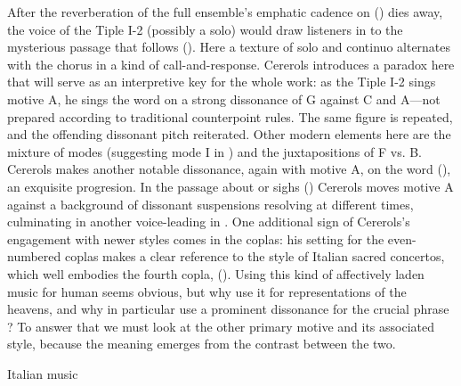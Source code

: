 After the reverberation of the full ensemble's emphatic cadence on
 () dies away, the voice of the Tiple I-2
(possibly a solo) would draw listeners in to the mysterious passage that
follows ().
Here a texture of solo and continuo alternates with the chorus in a kind of
call-and-response.
Cererols introduces a paradox here that will serve as an interpretive key for
the whole work: as the Tiple I-2 sings motive A, he sings the word
 on a strong dissonance of G against C\sh{} and A---not
prepared according to traditional counterpoint rules.
The same figure is repeated, and the offending dissonant pitch reiterated.
Other modern elements here are the mixture of modes (suggesting mode I in
) and the juxtapositions of F\sh{} vs. B\fl{}.
Cererols makes another notable dissonance, again with motive A, on the word
 (), an exquisite
 progresion.
In the passage about  or sighs () Cererols
moves motive A against a background of dissonant suspensions resolving at
different times, culminating in another voice-leading  in
.
One additional sign of Cererols's engagement with newer styles comes in the
coplas: his setting for the even-numbered coplas makes a clear reference to the
style of Italian sacred concertos, which well embodies the fourth copla,
 ().
Using this kind of affectively laden music for human  seems
obvious, but why use it for representations of the heavens, and why in
particular use a prominent dissonance for the crucial phrase ?
To answer that we must look at the other primary motive and its associated
style, because the meaning emerges from the contrast between the two.

    Italian music

